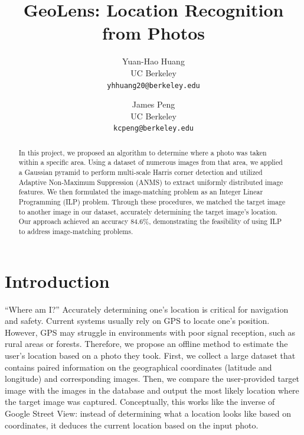 \documentclass[10pt,twocolumn,letterpaper]{article}
\begin{document}
\title{GeoLens: Location Recognition from Photos}

\author{Yuan-Hao Huang\\
UC Berkeley\\
{\tt\small yhhuang20@berkeley.edu}
\and
James Peng\\
UC Berkeley\\
{\tt\small kcpeng@berkeley.edu}
}
\maketitle

\begin{abstract}
   In this project, we proposed an algorithm to determine where a photo was taken within a specific area. Using a dataset of numerous images from that area, we applied a Gaussian pyramid to perform multi-scale Harris corner detection and utilized Adaptive Non-Maximum Suppression (ANMS) to extract uniformly distributed image features. We then formulated the image-matching problem as an Integer Linear Programming (ILP) problem. Through these procedures, we matched the target image to another image in our dataset, accurately determining the target image's location. Our approach achieved an accuracy 84.6\%, demonstrating the feasibility of using ILP to address image-matching problems.
\end{abstract}


\section{Introduction}
``Where am I?'' Accurately determining one's location is critical for navigation and safety. Current systems usually rely on GPS to locate one's position. However, GPS may struggle in environments with poor signal reception, such as rural areas or forests. Therefore, we propose an offline method to estimate the user's location based on a photo they took. First, we collect a large dataset that contains paired information on the geographical coordinates (latitude and longitude) and corresponding images. Then, we compare the user-provided target image with the images in the database and output the most likely location where the target image was captured. Conceptually, this works like the inverse of Google Street View: instead of determining what a location looks like based on coordinates, it deduces the current location based on the input photo. 
\end{document}
